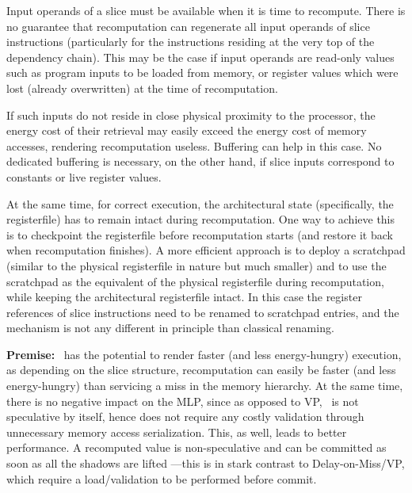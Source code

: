 Input operands of a slice must be available when it is time to recompute. 
There is no guarantee that recomputation can regenerate all input operands of slice instructions (particularly for the instructions residing at the very top of the dependency chain).  
This may be the case if input operands
are read-only values such as program
inputs to be loaded from memory, or register values which were lost (already overwritten) at the time of
recomputation. 
If such inputs do not
reside in close physical proximity to the processor, the energy cost of their
retrieval may easily exceed the energy cost of memory accesses, rendering recomputation useless.    
Buffering can help in this case. No dedicated buffering is necessary, on the other hand, if slice inputs
correspond to constants or live register values. 

At the same time,
for correct execution,  
 the architectural state (specifically, the registerfile) has to remain
intact
during recomputation.  
One way to achieve this is to
checkpoint the registerfile before recomputation starts (and restore it back when recomputation finishes).
A more efficient approach is
to deploy a scratchpad (similar to the physical registerfile in nature but much smaller) and to 
use the scratchpad as the equivalent of the physical registerfile during recomputation, while keeping the architectural registerfile intact. In this case the register references of slice
instructions need to be renamed to scratchpad entries, and the mechanism is not any different in principle than classical renaming. 


{\noindent \bf Premise:}
\recomp\ has the potential to render faster (and less energy-hungry) execution, as depending on the slice structure, recomputation can easily be faster (and less energy-hungry) than servicing a miss in the memory hierarchy. At the same time, there is no negative impact on the MLP, since as opposed to VP, \recomp\ is not speculative by itself, hence does not require any costly validation through unnecessary memory access serialization. This, as well, leads to better performance. A recomputed value is non-speculative and can be committed as soon as all the shadows are lifted ---this is in stark contrast to Delay-on-Miss/VP, which require a load/validation to be performed before commit.

